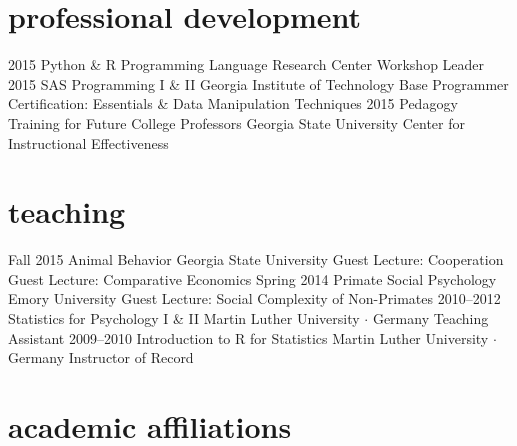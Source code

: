\documentclass[]{friggeri-cv}
\begin{document}
\newpage
\thispagestyle{fancy}

\section{professional development}

\begin{entrylist}
  \entry
    {2015}
    {Python \& R Programming}
    {Language Research Center}
    {Workshop Leader} %
  \entry
    {2015}
    {SAS Programming I \& II}
    {Georgia Institute of Technology}
    {Base Programmer Certification: Essentials \& Data Manipulation Techniques}
  \entry
    {2015}
    {Pedagogy Training for Future College Professors}
    {Georgia State University}
    {Center for Instructional Effectiveness}
\end{entrylist}


\section{teaching}

\begin{entrylist}
  \entry
    {Fall 2015}
    {Animal Behavior}
    {Georgia State University}
    {Guest Lecture: Cooperation\\
    Guest Lecture: Comparative Economics}
  \entry
    {Spring 2014}
    {Primate Social Psychology}
    {Emory University}
    {Guest Lecture: Social Complexity of Non-Primates}
  \entry
    {2010--2012}
    {Statistics for Psychology I \& II}
    {Martin Luther University $\cdot$ Germany}
    {Teaching Assistant}
  \entry
    {2009--2010}
    {Introduction to R for Statistics}
    {Martin Luther University $\cdot$ Germany}
    {Instructor of Record}
\end{entrylist}


\section{academic affiliations}
\end{document}
